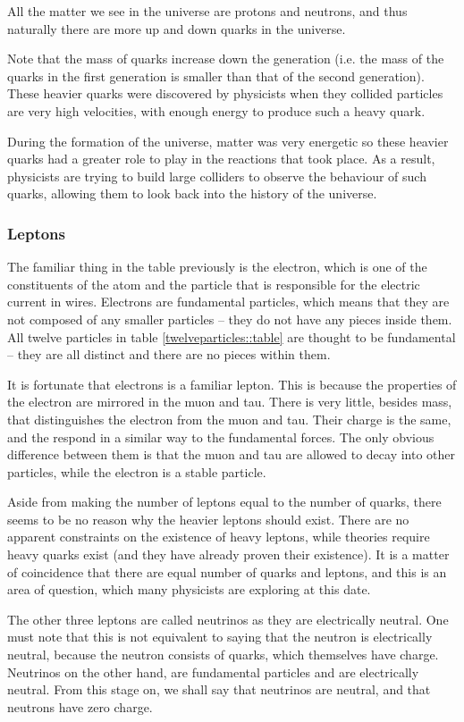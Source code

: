 All the matter we see in the universe are protons and neutrons, and thus naturally there are more up and down quarks in the universe.

Note that the mass of quarks increase down the generation (i.e. the mass of the quarks in the first generation is smaller than that of the second generation). These heavier quarks were discovered by physicists when they collided particles are very high velocities, with enough energy to produce such a heavy quark.

During the formation of the universe, matter was very energetic so these heavier quarks had a greater role to play in the reactions that took place. As a result, physicists are trying to build large colliders to observe the behaviour of such quarks, allowing them to look back into the history of the universe.

\subsubsection{Leptons}
The familiar thing in the table previously is the electron, which is
one of the constituents of the atom and the particle that is
responsible for the electric current in wires. Electrons are
fundamental particles, which means that they are not composed of any
smaller particles -- they do not have any pieces inside them. All twelve
particles in table \ref{twelveparticles::table} are thought to be
fundamental --  they are all distinct and there are no pieces within them. 

It is fortunate that electrons is a familiar lepton. This is because the properties of the electron are mirrored in the muon and tau. There is very little, besides mass, that distinguishes the electron from the muon and tau. Their charge is the same, and the respond in a similar way to the fundamental forces. The only obvious difference between them is that the muon and tau are allowed to decay into other particles, while the electron is a stable particle.

Aside from making the number of leptons equal to the number of quarks, there seems to be no reason why the heavier leptons should exist. There are no apparent constraints on the existence of heavy leptons, while theories require heavy quarks exist (and they have already proven their existence). It is a matter of coincidence that there are equal number of quarks and leptons, and this is an area of question, which many physicists are exploring at this date.

The other three leptons are called neutrinos as they are electrically neutral. One must note that this is not equivalent to saying that the neutron is electrically neutral, because the neutron consists of quarks, which themselves have charge. Neutrinos on the other hand, are fundamental particles and are electrically neutral. From this stage on, we shall say that neutrinos are neutral, and that neutrons have zero charge.

